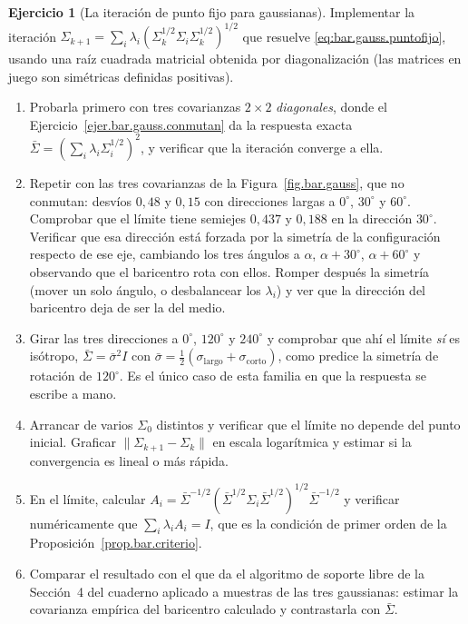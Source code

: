 \documentclass[12pt, a4paper]{amsbook}
\theoremstyle{remark}
\theoremstyle{definition}
\newtheorem{ejercicio}{Ejercicio}[chapter]
\numberwithin{section}{chapter}
\numberwithin{subsection}{section}
\numberwithin{equation}{section}
\numberwithin{figure}{chapter}
\begin{document}
\begin{ejercicio}[La iteración de punto fijo para gaussianas]\label{ejc.bar.gauss.iteracion}
Implementar la iteración
$\Sigma_{k+1}=\sum_i\lambda_i(\Sigma_k^{1/2}\Sigma_i\Sigma_k^{1/2})^{1/2}$ que
resuelve \eqref{eq:bar.gauss.puntofijo}, usando una raíz cuadrada matricial
obtenida por diagonalización (las matrices en juego son simétricas definidas
positivas).
\begin{enumerate}[label=(\alph*)]
\item Probarla primero con tres covarianzas $2\times2$ \emph{diagonales}, donde
el Ejercicio~\ref{ejer.bar.gauss.conmutan} da la respuesta exacta
$\bar\Sigma=(\sum_i\lambda_i\Sigma_i^{1/2})^2$, y verificar que la iteración
converge a ella.
\item Repetir con las tres covarianzas de la Figura~\ref{fig.bar.gauss}, que
no conmutan: desvíos $0{,}48$ y $0{,}15$ con direcciones largas a $0^\circ$,
$30^\circ$ y $60^\circ$. Comprobar que el límite tiene semiejes $0{,}437$ y
$0{,}188$ en la dirección $30^\circ$. Verificar que esa dirección está forzada
por la simetría de la configuración respecto de ese eje, cambiando los tres
ángulos a $\alpha$, $\alpha+30^\circ$, $\alpha+60^\circ$ y observando que el
baricentro rota con ellos. Romper después la simetría (mover un solo ángulo, o
desbalancear los $\lambda_i$) y ver que la dirección del baricentro deja de
ser la del medio.
\item Girar las tres direcciones a $0^\circ$, $120^\circ$ y $240^\circ$ y
comprobar que ahí el límite \emph{sí} es isótropo, $\bar\Sigma=\bar\sigma^2I$
con $\bar\sigma=\tfrac12(\sigma_{\text{largo}}+\sigma_{\text{corto}})$, como
predice la simetría de rotación de $120^\circ$. Es el único caso de esta
familia en que la respuesta se escribe a mano.
\item Arrancar de varios $\Sigma_0$ distintos y verificar que el límite no
depende del punto inicial. Graficar $\|\Sigma_{k+1}-\Sigma_k\|$ en escala
logarítmica y estimar si la convergencia es lineal o más rápida.
\item En el límite, calcular
$A_i=\bar\Sigma^{-1/2}(\bar\Sigma^{1/2}\Sigma_i\bar\Sigma^{1/2})^{1/2}\bar\Sigma^{-1/2}$
y verificar numéricamente que $\sum_i\lambda_iA_i=I$, que es la condición de
primer orden de la Proposición~\ref{prop.bar.criterio}.
\item Comparar el resultado con el que da el algoritmo de soporte libre de la
Sección~4 del cuaderno aplicado a muestras de las tres gaussianas: estimar la
covarianza empírica del baricentro calculado y contrastarla con $\bar\Sigma$.
\end{enumerate}
\end{ejercicio}
\end{document}
